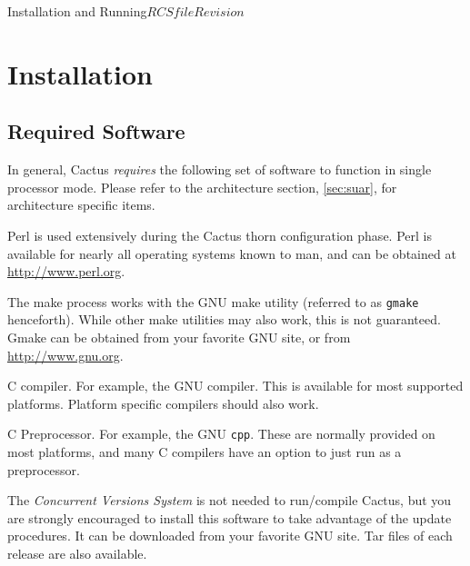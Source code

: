 
\begin{cactuspart}{Installation and Running}{$RCSfile$}{$Revision$}
\label{part:RunningCactus}
\renewcommand{\thepage}{\Alph{part}\arabic{page}}


\chapter{Installation}
\label{cha:in}


\section{Required Software}
\label{sec:required_software}

In general, Cactus \emph{requires} the following set of software to function
in single processor mode. Please refer to the architecture section,
\ref{sec:suar}, for architecture specific items.
\begin{Lentry}
\item[Perl5.0] Perl is used extensively during the Cactus
  thorn configuration phase. Perl is available for nearly all
  operating systems known to man, and can be obtained at
  \url{http://www.perl.org}.
\item[GNU make] The make
  process works with the GNU make utility (referred to as \texttt{gmake}
  henceforth). While other make utilities may also work, this is not
  guaranteed. Gmake can be obtained from your favorite GNU site, or
  from \url{http://www.gnu.org}.
\item[C] C compiler. For example, the GNU compiler. This
 is available for most supported platforms.  Platform specific compilers
 should also work.
\item[CPP] C Preprocessor. For example, the GNU \texttt{cpp}.  These are
  normally provided on most platforms, and many C compilers have an option
  to just run as a preprocessor.
\item[CVS] The \textit{Concurrent Versions System} is not needed
  to run/compile Cactus, but you are strongly encouraged to install
  this software to take advantage of the update procedures. It can be
  downloaded from your favorite GNU site.  Tar files of each release are
  also available.
\end{Lentry}


\end{cactuspart}
